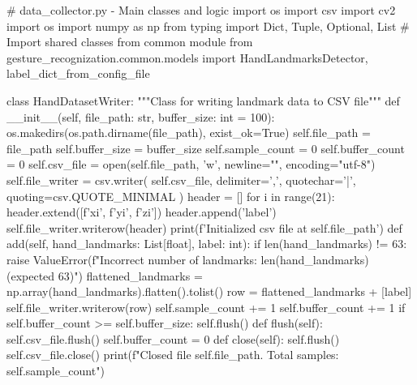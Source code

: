 \begin{aivncodebox}
\begin{python}
# data_collector.py - Main classes and logic
import os
import csv
import cv2
import os
import numpy as np
from typing import Dict, Tuple, Optional, List
# Import shared classes from common module
from gesture_recognization.common.models import HandLandmarksDetector, label_dict_from_config_file

class HandDatasetWriter:
    """Class for writing landmark data to CSV file"""
    def __init__(self, file_path: str, buffer_size: int = 100):
        os.makedirs(os.path.dirname(file_path), exist_ok=True)
        self.file_path = file_path
        self.buffer_size = buffer_size
        self.sample_count = 0
        self.buffer_count = 0
        self.csv_file = open(self.file_path, 'w', newline="", encoding="utf-8")
        self.file_writer = csv.writer(
            self.csv_file,
            delimiter=',',
            quotechar='|',
            quoting=csv.QUOTE_MINIMAL
        )
        header = []
        for i in range(21):
            header.extend([f'x{i}', f'y{i}', f'z{i}'])
        header.append('label')
        self.file_writer.writerow(header)
        print(f'Initialized csv file at {self.file_path}')
    def add(self, hand_landmarks: List[float], label: int):
        if len(hand_landmarks) != 63:
            raise ValueError(f"Incorrect number of landmarks: {len(hand_landmarks)} (expected 63)")
        flattened_landmarks = np.array(hand_landmarks).flatten().tolist()
        row = flattened_landmarks + [label]
        self.file_writer.writerow(row)
        self.sample_count += 1
        self.buffer_count += 1
        if self.buffer_count >= self.buffer_size:
            self.flush()
    def flush(self):
        self.csv_file.flush()
        self.buffer_count = 0
    def close(self):
        self.flush()
        self.csv_file.close()
        print(f"Closed file {self.file_path}. Total samples: {self.sample_count}")


\end{python}
\end{aivncodebox}

